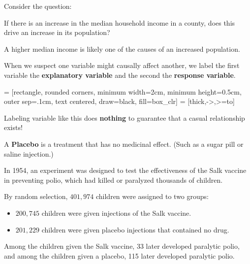 \documentclass{beamer}
\begin{document}
\begin{frame}
\begin{example}
Consider the question:
\begin{center}
If there is an increase in the median household income in a county, does this drive an increase in its population?
\end{center}\pause

A higher median income is likely one of the causes of an increased population.
\end{example}\pause

\begin{definition}
When we suspect one variable might causally affect another, we label the first variable the \textbf{explanatory variable} and the second the \textbf{response variable}.
\vspace{-4mm}
\begin{center}
 = [rectangle, rounded corners, minimum width=2cm, minimum height=0.5cm, outer sep=.1cm, text centered, draw=black, fill=box_clr]
 = [thick,->,>=to]
\end{center}
\end{definition}\pause

\begin{note}
Labeling variable like this does \textbf{nothing} to guarantee that a casual relationship exists!
\end{note}
\end{frame}

\begin{frame}
\begin{definition}
A \textbf{Placebo} is a treatment that has no medicinal effect. (Such as a sugar pill or saline injection.)
\end{definition}\pause

\begin{example}
In 1954, an experiment was designed to test the effectiveness of the Salk vaccine in preventing polio, which had killed or paralyzed thousands of children.\pause

By random selection, $401, 974$ children were assigned to two groups:
\begin{itemize}
\item $200,745$ children were given injections of the Salk vaccine.
\item $201,229$ children were given placebo injections that contained no drug.
\end{itemize}\pause

Among the children given the Salk vaccine, 33 later developed paralytic polio, and among the children given a placebo, 115 later developed paralytic polio.
\end{example}
\end{frame}
\end{document}
